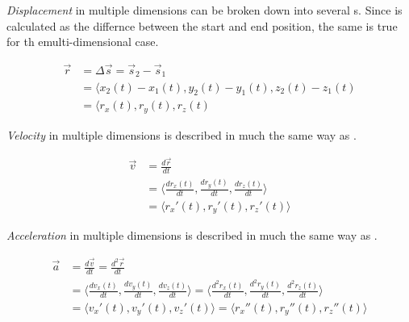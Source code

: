 \begin{definition} \label{Multi-D Displacement}
  \emph{Displacement} in multiple dimensions can be broken down into several s.
  Since  is calculated as the differnce between the start and end position, the same is true for th emulti-dimensional case.

  \begin{equation} \label{eq:Multi-D Displacement}
    \begin{aligned}
      \vec{r} &= \Delta \vec{s} = \vec{s}_{2} - \vec{s}_{1} \\
      &= \langle x_{2}(t)-x_{1}(t), y_{2}(t)-y_{1}(t), z_{2}(t)-z_{1}(t) \\
      &= \langle r_{x}(t), r_{y}(t), r_{z}(t)
    \end{aligned}
  \end{equation}
\end{definition}

\begin{definition} \label{Multi-D Velocity}
  \emph{Velocity} in multiple dimensions is described in much the same way as .

  \begin{equation} \label{eq:Multi-D Velocity}
    \begin{aligned}
      \vec{v} &= \frac{d \vec{r}}{dt} \\
      &= \biggl \langle \frac{d r_{x}(t)}{dt}, \frac{d r_{y}(t)}{dt}, \frac{d r_{z}(t)}{dt} \biggr \rangle \\
      &= \bigl \langle r_{x}'(t), r_{y}'(t), r_{z}'(t) \bigr \rangle
    \end{aligned}
  \end{equation}
\end{definition}

\begin{definition} \label{Multi-D Acceleration}
  \emph{Acceleration} in multiple dimensions is described in much the same way as .

  \begin{equation} \label{eq:Multi-D Acceleration}
    \begin{aligned}
      \vec{a} &= \frac{d \vec{v}}{dt} = \frac{d^{2} \vec{r}}{dt} \\
      &= \biggl \langle \frac{d v_{x}(t)}{dt}, \frac{d v_{y}(t)}{dt}, \frac{d v_{z}(t)}{dt} \biggr \rangle = \biggl \langle \frac{d^{2} r_{x}(t)}{dt}, \frac{d^{2} r_{y}(t)}{dt}, \frac{d^{2} r_{z}(t)}{dt} \biggr \rangle \\
      &= \bigl \langle v_{x}'(t), v_{y}'(t), v_{z}'(t) \bigr \rangle = \bigl \langle r_{x}''(t), r_{y}''(t), r_{z}''(t) \bigr \rangle
    \end{aligned}
  \end{equation}
\end{definition}

